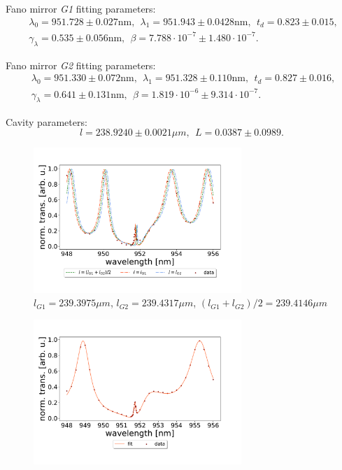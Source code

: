 Fano mirror \emph{G1} fitting parameters:
\begin{equation}
    \begin{split}
        &\lambda_0 = 951.728 \pm 0.027 \text{nm}, \:\: \lambda_1 = 951.943 \pm 0.0428 \text{nm}, \:\: t_d = 0.823 \pm 0.015, \:\: \\&\gamma_{\lambda} = 0.535 \pm 0.056 \text{nm}, \:\: \beta = 7.788 \cdot 10^{-7} \pm 1.480 \cdot 10^{-7}.
    \end{split}
\end{equation}

Fano mirror \emph{G2} fitting parameters:
\begin{equation}
    \begin{split}
        &\lambda_0 = 951.330 \pm 0.072 \text{nm}, \:\: \lambda_1 = 951.328 \pm 0.110 \text{nm}, \:\: t_d = 0.827 \pm 0.016, \:\: \\&\gamma_{\lambda} = 0.641 \pm 0.131 \text{nm}, \:\: \beta = 1.819 \cdot 10^{-6} \pm 9.314 \cdot 10^{-7}.
    \end{split}
\end{equation}

Cavity parameters:
\begin{equation}
    l = 238.9240 \pm 0.0021 \mu m, \:\: L = 0.0387 \pm 0.0989.
\end{equation}


\begin{figure}[h!]
    \centering
    \includegraphics[width=0.7\textwidth]{figures/results/238um_long_scan_sim_comparison.pdf}
    \caption{$l_{G1} = 239.3975 \mu m$, $l_{G2} = 239.4317 \mu m$, $(l_{G1} + l_{G2})/2 = 239.4146 \mu m$}
    \label{fig:238um_long_scan_sim_comparison}
\end{figure}

\begin{figure}[h!]
    \centering
    \includegraphics[width=0.7\textwidth]{figures/results/129um_long_scan_fit.pdf}
    \caption{}
    \label{fig:129um_long_scan_fit}
\end{figure}

